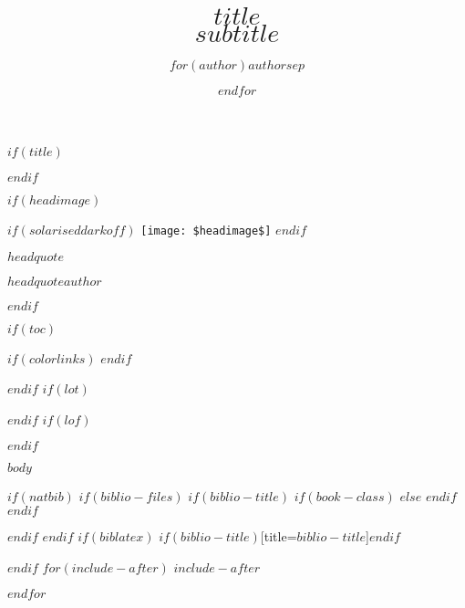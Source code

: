 \documentclass[$if(fontsize)$$fontsize$,$endif$$if(lang)$$babel-lang$,$endif$$if(papersize)$$papersize$paper,$endif$$for(classoption)$$classoption$$sep$,$endfor$]{tufte-book}
\date{}
\title{$title$ \\ \small $subtitle$}
\author{$for(author)$$author$$sep$ \and $endfor$}
\newcommand\crule[3][black]{\textcolor{#1}{\rule{#2}{#3}}}
\begin{document}
$if(title)$
\maketitle
$endif$




$if(headimage)$
\begin{marginfigure}
$if(solariseddarkoff)$
\texttt{[image: \$headimage\$]}
$endif$
\epigraph{$headquote$}{\textit{$headquoteauthor$}}
\end{marginfigure}
$endif$




$if(toc)$
{
$if(colorlinks)$
\hypersetup{linkcolor=$if(toccolor)$$toccolor$$else$black$endif$}
$endif$
\setcounter{tocdepth}{$toc-depth$}
\tableofcontents
}
$endif$
$if(lot)$
\listoftables
$endif$
$if(lof)$
\listoffigures
$endif$

\mainmatter

$body$



$if(natbib)$
$if(biblio-files)$
$if(biblio-title)$
$if(book-class)$
\renewcommand\bibname{$biblio-title$}
$else$
\renewcommand\refname{$biblio-title$}
$endif$
$endif$



$endif$
$endif$
$if(biblatex)$
\printbibliography$if(biblio-title)$[title=$biblio-title$]$endif$

$endif$
$for(include-after)$
$include-after$

$endfor$
\end{document}
